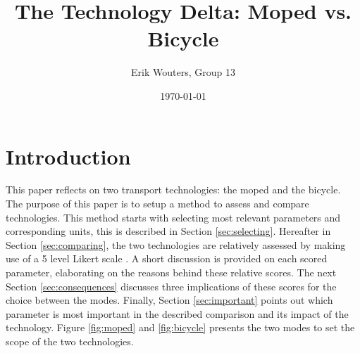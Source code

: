 \documentclass[a4paper]{article}
\title{The Technology Delta: Moped vs. Bicycle}
\author{Erik Wouters, Group 13}
\date{\today}
\begin{document}
\maketitle


\section{Introduction}
\label{sec:introduction}
This paper reflects on two transport technologies: the moped and the bicycle. The purpose of this paper is to setup a method to assess and compare technologies. This method starts with selecting most relevant parameters and corresponding units, this is described in Section \ref{sec:selecting}. Hereafter in Section \ref{sec:comparing}, the two technologies are relatively assessed by making use of a 5 level Likert scale \cite{likert}. A short discussion is provided on each scored parameter, elaborating on the reasons behind these relative scores. The next Section \ref{sec:consequences} discusses three implications of these scores for the choice between the modes. Finally, Section \ref{sec:important} points out which parameter is most important in the described comparison and its impact of the technology. Figure \ref{fig:moped} and \ref{fig:bicycle} presents the two modes to set the scope of the two technologies.

\end{document}

